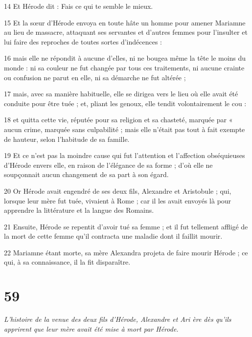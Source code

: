 \par 14 Et Hérode dit : Fais ce qui te semble le mieux.

\par 15 Et la sœur d'Hérode envoya en toute hâte un homme pour amener Mariamne au lieu de massacre, attaquant ses servantes et d'autres femmes pour l'insulter et lui faire des reproches de toutes sortes d'indécences :

\par 16 mais elle ne répondit à aucune d'elles, ni ne bougea même la tête le moins du monde : ni sa couleur ne fut changée par tous ces traitements, ni aucune crainte ou confusion ne parut en elle, ni sa démarche ne fut altérée ;

\par 17 mais, avec sa manière habituelle, elle se dirigea vers le lieu où elle avait été conduite pour être tuée ; et, pliant les genoux, elle tendit volontairement le cou :

\par 18 et quitta cette vie, réputée pour sa religion et sa chasteté, marquée par « aucun crime, marquée sans culpabilité ; mais elle n'était pas tout à fait exempte de hauteur, selon l'habitude de sa famille.

\par 19 Et ce n'est pas la moindre cause qui fut l'attention et l'affection obséquieuses d'Hérode envers elle, en raison de l'élégance de sa forme ; d'où elle ne soupçonnait aucun changement de sa part à son égard.

\par 20 Or Hérode avait engendré de ses deux fils, Alexandre et Aristobule ; qui, lorsque leur mère fut tuée, vivaient à Rome ; car il les avait envoyés là pour apprendre la littérature et la langue des Romains.

\par 21 Ensuite, Hérode se repentit d'avoir tué sa femme ; et il fut tellement affligé de la mort de cette femme qu'il contracta une maladie dont il faillit mourir.

\par 22 Mariamne étant morte, sa mère Alexandra projeta de faire mourir Hérode ; ce qui, à sa connaissance, il la fit disparaître.

\chapter{59}

\par \textit{L'histoire de la venue des deux fils d'Hérode, Alexandre et Ari ère dès qu'ils apprirent que leur mère avait été mise à mort par Hérode.}

